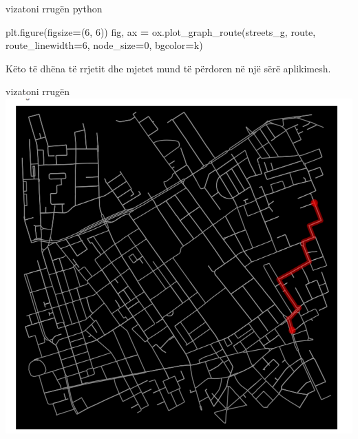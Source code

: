 \documentclass[
  ignorenonframetext,
]{beamer}
\newenvironment{Shaded}{\begin{snugshade}}{\end{snugshade}}
\newcommand{\DecValTok}[1]{\textcolor[rgb]{0.00,0.00,0.81}{#1}}
\newcommand{\NormalTok}[1]{#1}
\newcommand{\OperatorTok}[1]{\textcolor[rgb]{0.81,0.36,0.00}{\textbf{#1}}}
\newcommand{\StringTok}[1]{\textcolor[rgb]{0.31,0.60,0.02}{#1}}
\begin{document}
\begin{frame}[fragile]{vizatoni rrugën}
\protect\hypertarget{vizatoni-rruguxebn}{}
python

\begin{Shaded}
\begin{Highlighting}[]
\NormalTok{plt.figure(figsize}\OperatorTok{=}\NormalTok{(}\DecValTok{6}\NormalTok{, }\DecValTok{6}\NormalTok{))}
\NormalTok{fig, ax }\OperatorTok{=}\NormalTok{ ox.plot\_graph\_route(streets\_g, route, route\_linewidth}\OperatorTok{=}\DecValTok{6}\NormalTok{, node\_size}\OperatorTok{=}\DecValTok{0}\NormalTok{, bgcolor}\OperatorTok{=}\StringTok{\textquotesingle{}k\textquotesingle{}}\NormalTok{)}
\end{Highlighting}
\end{Shaded}

Këto të dhëna të rrjetit dhe mjetet mund të përdoren në një sërë
aplikimesh.
\end{frame}

\begin{frame}{vizatoni rrugën}
\protect\hypertarget{vizatoni-rruguxebn-1}{}
\includegraphics{./Figs/rrugshkurter2.png}
\end{frame}
\end{document}
